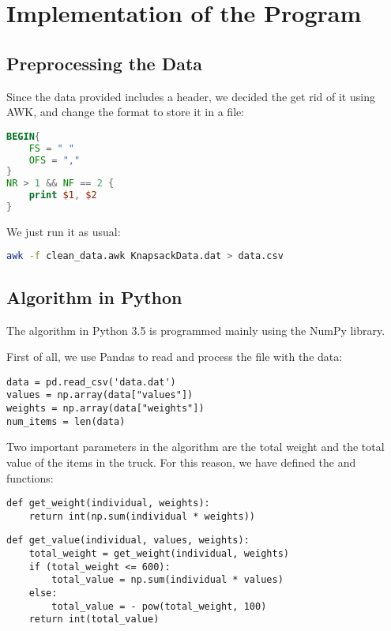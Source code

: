 \section{Implementation of the Program}\label{sec:implementation}

\subsection{Preprocessing the Data}
Since the data provided includes a header, we decided the get rid of it using AWK, and change the format to store it in a  file:
\begin{lstlisting}[language=awk]
BEGIN{
	FS = " "
	OFS = ","
}
NR > 1 && NF == 2 {
	print $1, $2
}
\end{lstlisting}

We just run it as usual:
\begin{lstlisting}[language=bash]
awk -f clean_data.awk KnapsackData.dat > data.csv
\end{lstlisting}


\subsection{Algorithm in Python}
The algorithm in Python 3.5 is programmed mainly using the NumPy library. 

First of all, we use Pandas to read and process the file with the data:
\begin{lstlisting}
data = pd.read_csv('data.dat')
values = np.array(data["values"])
weights = np.array(data["weights"])
num_items = len(data)
\end{lstlisting}


Two important parameters in the algorithm are the total weight and the total value of the items in the truck. For this reason, we have defined the  and  functions:
\begin{lstlisting}
def get_weight(individual, weights):
	return int(np.sum(individual * weights))
\end{lstlisting}

\begin{lstlisting}
def get_value(individual, values, weights):
	total_weight = get_weight(individual, weights)
	if (total_weight <= 600):
		total_value = np.sum(individual * values)
	else:
		total_value = - pow(total_weight, 100)
	return int(total_value)
\end{lstlisting}

